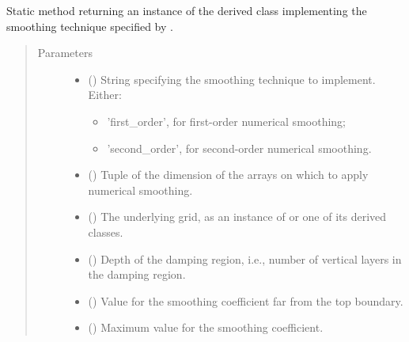 \documentclass[letterpaper,10pt,english]{sphinxmanual}
\begin{document}
\begin{fulllineitems}
\begin{fulllineitems}
\label{\detokenize{api:dycore.horizontal_smoothing.HorizontalSmoothing.factory}}
Static method returning an instance of the derived class implementing the smoothing technique
specified by .
\begin{quote}\begin{description}
\item[{Parameters}] \leavevmode\begin{itemize}
\item {} 
 () \textendash{} 
String specifying the smoothing technique to implement. Either:
\begin{itemize}
\item {} 
’first\_order’, for first-order numerical smoothing;

\item {} 
’second\_order’, for second-order numerical smoothing.

\end{itemize}


\item {} 
 () \textendash{} Tuple of the dimension of the arrays on which to apply numerical smoothing.

\item {} 
 () \textendash{} The underlying grid, as an instance of {\hyperref[\detokenize{api:grids.grid_xyz.GridXYZ}]{}} or one of its derived classes.

\item {} 
 () \textendash{} Depth of the damping region, i.e., number of vertical layers in the damping region.

\item {} 
 () \textendash{} Value for the smoothing coefficient far from the top boundary.

\item {} 
 () \textendash{} Maximum value for the smoothing coefficient.


\end{itemize}
\end{description}
\end{quote}
\end{fulllineitems}
\end{fulllineitems}
\end{document}
